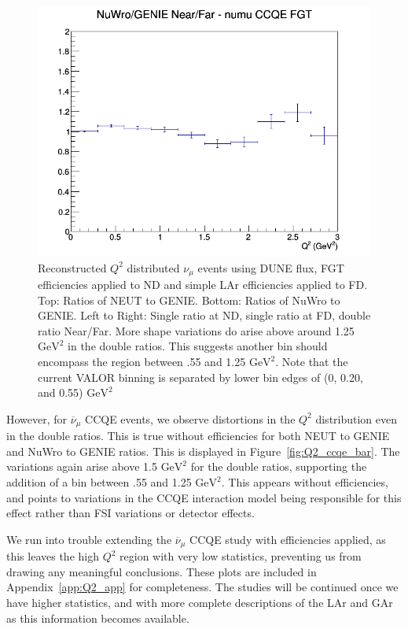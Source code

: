\documentclass[12pt]{article}
\begin{document}
\begin{figure}[h]
\endminipage
{}
\includegraphics[width=\linewidth]{eff_Q2/FGT/ratios/CCQE_NuWro_GENIE_numu_NF_Q2.png}
\endminipage
\caption{Reconstructed $Q^2$ distributed $\nu_{\mu}$ events using DUNE flux, FGT efficiencies applied to ND and simple LAr efficiencies applied to FD. Top: Ratios of NEUT to GENIE. Bottom: Ratios of NuWro to GENIE. Left to Right: Single ratio at ND, single ratio at FD, double ratio Near/Far. More shape variations do arise above around 1.25 $\textrm{GeV}^2$ in the double ratios. This suggests another bin should encompass the region between .55 and 1.25 $\textrm{GeV}^2$. Note that the current VALOR binning is separated by lower bin edges of (0, 0.20, and 0.55) $\textrm{GeV}^2$}
\label{fig:Q2_ccqe_FGT_eff}
\end{figure}
\FloatBarrier


However, for $\overline{\nu}_{\mu}$ CCQE events, we observe distortions in the $Q^2$ distribution even in the double ratios. This is true without efficiencies for both NEUT to GENIE and NuWro to GENIE ratios. This is displayed in Figure~\ref{fig:Q2_ccqe_bar}. The variations again arise above 1.5 $\textrm{GeV}^2$ for the double ratios, supporting the addition of a bin between .55 and 1.25 $\textrm{GeV}^2$. This appears without efficiencies, and points to variations in the CCQE interaction model being responsible for this effect rather than FSI variations or detector effects.

We run into trouble extending the $\overline{\nu}_{\mu}$ CCQE study with efficiencies applied, as this leaves the high $Q^2$ region with very low statistics, preventing us from drawing any meaningful conclusions. These plots are included in Appendix~\ref{app:Q2_app} for completeness. The studies will be continued once we have higher statistics, and with more complete descriptions of the LAr and GAr as this information becomes available.
\end{document}
